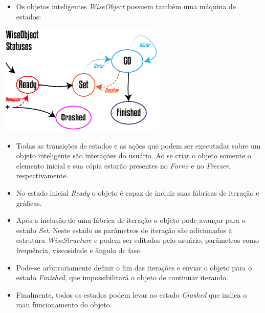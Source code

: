 \documentclass[10pt,aspectratio=169]{beamer}
\theoremstyle{remark}
\theoremstyle{definition}
\begin{document}
\begin{frame}[allowframebreaks]
		\framebreak
	
		\begin{itemize}
				\item Os objetos inteligentes \textit{WiseObject} possuem também uma máquina de estados:
		\end{itemize}		
		
		\begin{center}
			
			\item \includegraphics[width=0.6\textwidth]{Figures/WiseObjectStatus@16x.png}
			
		\end{center}
		
		\framebreak
		
		\begin{itemize}
			\item Todas as transições de estados e as ações que podem ser executadas sobre um objeto inteligente são interações do usuário. Ao se criar o objeto somente o elemento inicial e sua cópia estarão presentes no \textit{Forno} e no \textit{Freezer}, respectivamente.
			\item No estado inicial \textit{Ready} o objeto é capaz de incluir suas fábricas de iteração e gráficas.
			\item Após a inclusão de uma fábrica de iteração o objeto pode avançar para o estado \textit{Set}. Neste estado os parâmetros de iteração são adicionados à estrutura \textit{WiseStructure} e podem ser editados pelo usuário, parâmetros como frequência, viscosidade e ângulo de fase.
			\item Pode-se arbitrariamente definir o fim das iterações e enviar o objeto para o estado \textit{Finished}, que impossibilitará o objeto de continuar iterando.
			\item Finalmente, todos os estados podem levar ao estado \textit{Crashed} que indica o mau funcionamento do objeto.
		\end{itemize}
		
		\framebreak
		

\end{frame}
\end{document}
